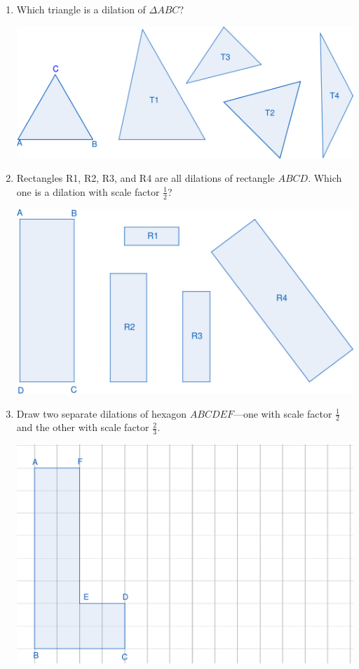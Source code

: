 \begin{enumerate}
    \item Which triangle is a dilation of $\Delta ABC$?
    \begin{center}\includegraphics[width=5in]{images/dilation01}\end{center}
    \wbnewpage
    \item Rectangles R1, R2, R3, and R4 are all dilations of rectangle $ABCD$. Which one is a dilation with scale factor $\displaystyle\frac12$?\par
    \begin{center}\includegraphics[width=5in]{images/dilation02}\end{center}
    \item Draw two separate dilations of hexagon $ABCDEF$---one with scale factor $\displaystyle \frac12$ and the other with scale factor $\displaystyle\frac23$.\par
    \begin{center}\includegraphics[width=5in]{images/dilation03}\end{center}

\end{enumerate}
